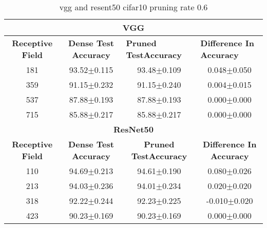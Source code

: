 \begin{table}[H]
\begin{tabular}{@{}cccc@{}}
\toprule
\multicolumn{4}{c}{\textbf{VGG}}                                                                                                                                  \\ \midrule
\textbf{Receptive Field} & \textbf{Dense Test Accuracy} & \multicolumn{1}{l}{\textbf{Pruned  TestAccuracy}} & \multicolumn{1}{l}{\textbf{Difference In Accuracy}} \\ \midrule
181                      & 93.52$\pm$0.115              & 93.48$\pm$0.109                                   & 0.048$\pm$0.050                                     \\
359                      & 91.15$\pm$0.232              & 91.15$\pm$0.240                                   & 0.004$\pm$0.015                                     \\
537                      & 87.88$\pm$0.193              & 87.88$\pm$0.193                                   & 0.000$\pm$0.000                                     \\
715                      & 85.88$\pm$0.217              & 85.88$\pm$0.217                                   & 0.000$\pm$0.000                                     \\ \midrule
\multicolumn{4}{c}{\textbf{ResNet50}}                                                                                                                             \\ \midrule
\textbf{Receptive Field} & \textbf{Dense Test Accuracy} & \textbf{Pruned  TestAccuracy}                     & \textbf{Difference In Accuracy}                     \\
110                      & 94.69$\pm$0.213              & 94.61$\pm$0.190                                   & 0.080$\pm$0.026                                     \\
213                      & 94.03$\pm$0.236              & 94.01$\pm$0.234                                   & 0.020$\pm$0.020                                     \\
318                      & 92.22$\pm$0.244              & 92.23$\pm$0.225                                   & -0.010$\pm$0.020                                    \\
423                      & 90.23$\pm$0.169              & 90.23$\pm$0.169                                   & 0.000$\pm$0.000                                     \\ \bottomrule
\end{tabular}
\caption{vgg and resent50 cifar10 pruning rate 0.6}
\label{tab:cifar10 pruning rate06}
\end{table}




